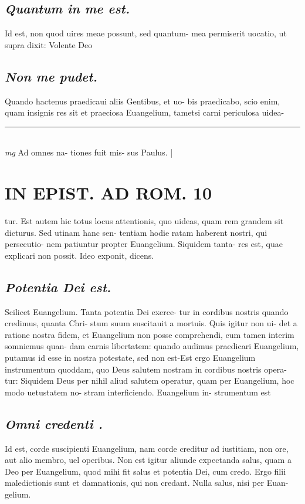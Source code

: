 \documentclass{article}
\begin{document}
\begin{pages}
\subsection*{\textit{Quantum in me est. }}\pstart Id est, non quod uires meae possunt, sed quantum- mea permiserit uocatio, ut supra dixit: Volente Deo  \pend
{}
{}
\subsection*{\textit{Non me pudet. }}\pstart Quando hactenus praedicaui aliis Gentibus, et uo- bis praedicabo, scio enim, quam insignis res sit et praeciosa Euangelium, tametsi carni periculosa uidea-  \pend
\vspace{0.5cm}\noindent
\vspace{0.2cm}\rule{1cm}{0.2pt}\\ 
\hspace{0.2cm}\textit{mg}
\footnotesize Ad omnes na- tiones fuit mis- sus Paulus. 
\normalsize| 
\section*{IN EPIST. AD ROM.  10 }
\marginpar{[ p.]}\pstart tur. Est autem hic totus locus attentionis, quo uideas, quam rem grandem sit dicturus. Sed utinam hanc sen- tentiam hodie ratam haberent nostri, qui persecutio- nem patiuntur propter Euangelium. Siquidem tanta- res est, quae explicari non possit. Ideo exponit, dicens.   \pend
{}
{}
\subsection*{\textit{Potentia Dei est. }}\pstart Scilicet Euangelium. Tanta potentia Dei exerce- tur in cordibus nostris quando credimus, quanta Chri- stum suum suscitauit a mortuis. Quis igitur non ui- det a ratione nostra fidem, et Euangelium non posse comprehendi, cum tamen interim somniemus quan- dam carnis libertatem: quando audimus praedicari Euangelium, putamus id esse in nostra potestate, sed non est-Est ergo Euangelium instrumentum quoddam, quo Deus salutem nostram in cordibus nostris opera- tur: Siquidem Deus per nihil aliud salutem operatur, quam per Euangelium, hoc modo uetustatem no- stram interficiendo.  Euangelium in- strumentum est  \pend
{}
{}
\subsection*{\textit{Omni credenti . }}\pstart Id est, corde suscipienti Euangelium, nam corde creditur ad iustitiam, non ore, aut alio membro, uel operibus. Non est igitur aliunde expectanda salus, quam a Deo per Euangelium, quod mihi fit salus et potentia Dei, cum credo. Ergo filii maledictionis sunt et damnationis, qui non credant.  Nulla salus, nisi per Euan- gelium.   \pend
{}
{}

\end{pages}
\end{document}
